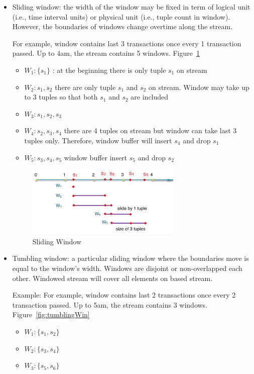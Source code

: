 \begin{itemize}
\item Sliding window: the width of the window may be fixed in term of logical unit (i.e., time interval units) or physical unit (i.e., tuple count in window). However, the boundaries of windows change overtime along the stream.

For example, window contains last 3 transactions once every 1 transaction passed. Up to 4am, the stream contains 5 windows. Figure~\ref{fig:slideWin}
\begin{itemize}
\item $W_1:\{s_1\}$ : at the beginning there is only tuple $s_1$ on stream
\item $W_2:{s_1, s_2}$ there are only tuple $s_1$ and $s_2$ on stream. Window may take up to 3 tuples so that both $s_1$ and $s_2$ are included  
\item $W_3:{s_1, s_2, s_3}$ 
\item $W_4:{s_2, s_3, s_4}$ there are 4 tuples on stream but window can take last 3 tuples only. Therefore, window buffer will insert $s_4$ and drop $s_1$
\item $W_5:{s_3, s_4,s_5}$  window buffer insert $s_5$ and drop $s_2$
\end{itemize}

\begin{figure}[htbp!] 
\centering    
\includegraphics[width=0.7\textwidth]{slideWin}
\caption{Sliding Window}
\label{fig:slideWin}
\end{figure}



\item Tumbling window: a particular sliding window where the boundaries move is equal to the window's width. Windows are disjoint or non-overlapped each other. Windowed stream will cover all elements on based stream.

Example: For example, window contains last 2 transactions once every 2 transaction passed. Up to 5am, the stream contains 3 windows. Figure~\ref{fig:tumblingWin}

\begin{itemize}
\item $W_1:\{s_1,s_2\}$ 
\item $W_2:\{s_3, s_4\}$ 
\item $W_3:\{s_5,s_6\}$ 
\end{itemize}


\end{itemize}
